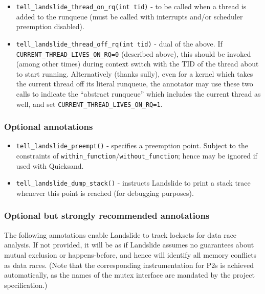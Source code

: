 \begin{itemize}
	\item {\tt tell\_landslide\_thread\_on\_rq(int tid)} - to be called when a thread is added to the runqueue
		(must be called with interrupts and/or scheduler preemption disabled).
	\item {\tt tell\_landslide\_thread\_off\_rq(int tid)} - dual of the above.
		If {\tt CURRENT\_THREAD\_\allowbreak{}LIVES\_ON\_RQ=0} (described above), this should be invoked (among other times) during context switch with the TID of the thread about to start running.
		Alternatively (thanks sully), even for a kernel which takes the current thread off its literal runqueue,
		the annotator may use these two calls to indicate the ``abstract runqueue'' which includes the current thread as well,
		and set {\tt CURRENT\_THREAD\_LIVES\_ON\_RQ=1}.
\end{itemize}

\subsubsection{Optional annotations}

\begin{itemize}
	\item {\tt tell\_landslide\_preempt()} - specifies a preemption point.
		Subject to the constraints of {\tt within\_function}/{\tt without\_function};
		hence may be ignored if used with Quicksand.
	\item {\tt tell\_landslide\_dump\_stack()} - instructs Landslide to print a stack trace whenever this point is reached (for debugging purposes).
\end{itemize}

\subsubsection{Optional but strongly recommended annotations}

The following annotations enable Landslide to track locksets for data race analysis.
If not provided, it will be as if Landslide assumes no guarantees about mutual exclusion or happens-before,
and hence will identify all memory conflicts as data races.
(Note that the corresponding instrumentation for P2s is achieved automatically,
as the names of the mutex interface are mandated by the project specification.)

